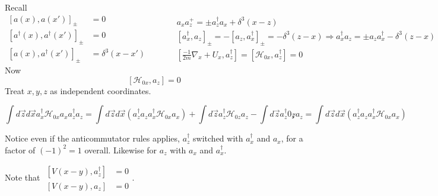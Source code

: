 \documentclass[twoside]{amsart}
\begin{document}
Recall
\[
\begin{aligned}
  \left[a(x),a(x') \right]_{\pm} & = 0  \\
  [a^{\dag}(x), a^{\dag}(x') ]_{\pm} & = 0  \\
  [a(x), a^{\dag}(x')]_{\pm} & = \delta^3(x-x')
\end{aligned} \quad \quad \, \begin{aligned} & a_x a_z^+ = \pm a_z^{\dag} a_x + \delta^3(x-z) \\ & [a^{\dag}_x, a_z ]_{\pm} = - [a_z, a_x^{\dag}]_{\pm} = -\delta^3(z-x) \Longrightarrow a_x^{\dag} a_z = \pm a_z a_x^{\dag} - \delta^3(z-x) \\ & [ \frac{-1}{2m} \nabla_x + U_x, a_z^{\dag} ] = [\mathcal{H}_{0x}, a_z^{\dag} ] = 0 
\end{aligned}
\]
Now
\[
\left[ \mathcal{H}_{0x}, a_z \right] =0 
\]
Treat $x,y,z$ as independent coordinates.  

\[
\int d\vec{z} d\vec{x} a_x^{\dag} \mathcal{H}_{0x} a_x a_z^{\dag} a_z = \int d\vec{z} d\vec{x} \left( a_z^{\dag} a_z a_x^{\dag} \mathcal{H}_{0x} a_x \right) + \int d\vec{z} a_z^{\dag} \mathcal{H}_{0z} a_z - \int d\vec{z} a_z^{\dag} \mathcal{0z} a_z = \int d\vec{z} d\vec{x} \left( a_z^{\dag} a_z a_x^{\dag} \mathcal{H}_{0x} a_x \right) 
\]

Notice even if the anticommutator rules applies, $a_z^{\dag}$ switched with $a_x^{\dag}$ and $a_x$, for a factor of $(-1)^2 =1$ overall.  Likewise for $a_z$ with $a_x$ and $a_x^{\dag}$.  

Note that $\begin{aligned} \left[ V(x-y),a_z^{\dag} \right] & = 0 \\ [V(x-y), a_z ] & = 0 \end{aligned}$.  
\end{document}
